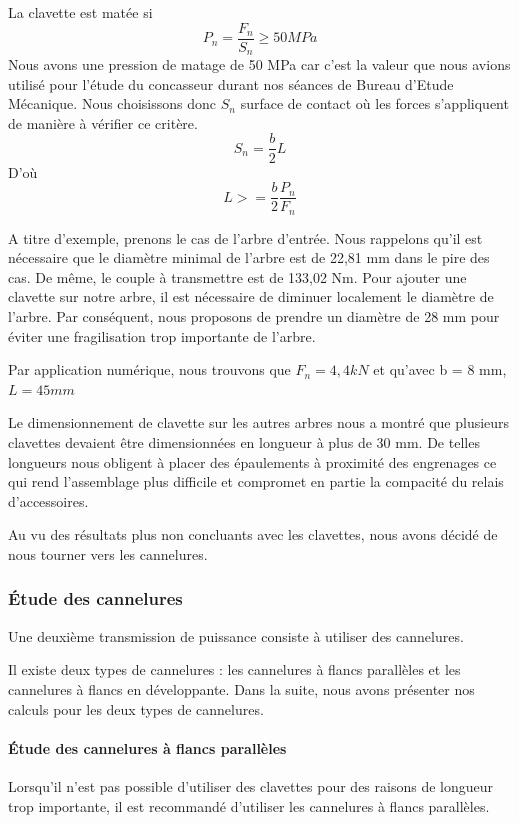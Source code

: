 \documentclass{config}
\begin{document}
\begin{spacing}{1.2}
La clavette est matée si 
\[P_n = \frac{F_n}{S_n}  \geq 50 MPa \]
Nous avons une pression de matage de 50 MPa car c'est la valeur que nous avions utilisé pour l'étude du concasseur durant nos séances de Bureau d'Etude Mécanique.
Nous choisissons donc $S_n$ surface de contact où les forces s'appliquent de manière à vérifier ce critère.
\[S_n = \frac{b}{2}L  \]
D'où  \[L>= \frac{b}{2}\frac{P_n}{F_n}\]

A titre d'exemple, prenons le cas de l'arbre d'entrée. Nous rappelons qu'il est nécessaire que le diamètre minimal de l'arbre est de 22,81 mm dans le pire des cas. De même, le couple à transmettre est de 133,02 Nm. 
Pour ajouter une clavette sur notre arbre, il est nécessaire de diminuer localement le diamètre de l'arbre. Par conséquent, nous proposons de prendre un diamètre de 28 mm pour éviter une fragilisation trop importante de l'arbre. 

Par application numérique, nous trouvons que $F_n = 4,4 kN$ et qu'avec b = 8 mm, $L = 45 mm$

Le dimensionnement de clavette sur les autres arbres nous a montré que plusieurs clavettes devaient être dimensionnées en longueur à plus de 30 mm. De telles longueurs nous obligent à placer des épaulements à proximité des engrenages ce qui rend l'assemblage plus difficile et compromet en partie la compacité du relais d'accessoires.

Au vu des résultats plus non concluants avec les clavettes, nous avons décidé de nous tourner vers les cannelures.

\subsubsection{Étude des cannelures}
Une deuxième transmission de puissance consiste à utiliser des cannelures.


Il existe deux types de cannelures : les cannelures à flancs parallèles et les cannelures à flancs en développante.
Dans la suite, nous avons présenter nos calculs pour les deux types de cannelures.

\paragraph{Étude des cannelures à flancs parallèles\\}

Lorsqu'il n'est pas possible d'utiliser des clavettes pour des raisons de longueur trop importante, il est recommandé d'utiliser les cannelures à flancs parallèles.


\end{spacing}
\end{document}

